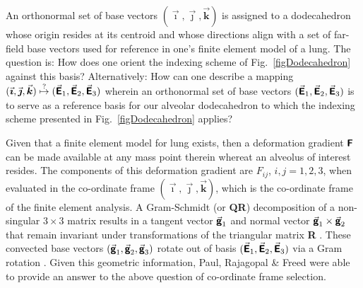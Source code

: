 An orthonormal set of base vectors $( \vec{\boldsymbol{\imath}} , \vec{\boldsymbol{\jmath}} , \vec{\boldsymbol{k}} )$ is assigned to a dodecahedron whose origin resides at its centroid and whose directions align with a set of far-field base vectors used for reference in one's finite element model of a lung.  The question is: How does one orient the indexing scheme of Fig.~\ref{figDodecahedron} against this basis?  Alternatively:  How can one describe a mapping $( \vec{\boldsymbol{\imath}} , \vec{\boldsymbol{\jmath}} , \vec{\boldsymbol{k}} ) \overset{\text{?}}{\mapsto} ( \vec{\boldsymbol{\mathsf{E}}}_1 , \vec{\boldsymbol{\mathsf{E}}}_2 , \vec{\boldsymbol{\mathsf{E}}}_3 )$ wherein an ortho\-normal set of base vectors $( \vec{\boldsymbol{\mathsf{E}}}_1 , \vec{\boldsymbol{\mathsf{E}}}_2 , \vec{\boldsymbol{\mathsf{E}}}_3 )$ is to serve as a reference basis for our alveolar dodecahedron to which the indexing scheme presented in Fig.~\ref{figDodecahedron} applies?

Given that a finite element model for lung exists, then a deformation gradient $\boldsymbol{\mathsf{F}}$ can be made available at any mass point therein whereat an alveolus of interest resides.  The components of this deformation gradient are $F_{ij}$, $i, j = 1,2,3$, when evaluated in the co-ordinate frame $( \vec{\boldsymbol{\imath}} , \vec{\boldsymbol{\jmath}} , \vec{\boldsymbol{k}} )$, which is the co-ordinate frame of the finite element analysis.  A Gram-Schmidt (or \textbf{QR}) decomposition of a non-singular $3 \! \times \! 3$ matrix results in a tangent vector $\vec{\boldsymbol{\mathsf{g}}}_1$ and normal vector $\vec{\boldsymbol{\mathsf{g}}}_1 \times \vec{\boldsymbol{\mathsf{g}}}_2$ that remain invariant under transformations of the triangular matrix \textbf{R} \cite{McLellan80}.  These convected base vectors $( \vec{\boldsymbol{\mathsf{g}}}_1 , \vec{\boldsymbol{\mathsf{g}}}_2 , \vec{\boldsymbol{\mathsf{g}}}_3 )$ rotate out of basis $( \vec{\boldsymbol{\mathsf{E}}}_1 , \vec{\boldsymbol{\mathsf{E}}}_2 , \vec{\boldsymbol{\mathsf{E}}}_3 )$ via a Gram rotation \cite{FreedZamani18}.  Given this geometric information, Paul, Rajagopal \& Freed \cite{Pauletal20} were able to provide an answer to the above question of co-ordinate frame selection.

